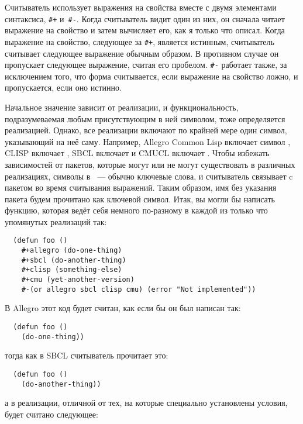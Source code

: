 Считыватель использует выражения на свойства вместе с двумя элементами синтаксиса,
\lstinline!#+! и~\lstinline!#-!. Когда считыватель видит один из них, он сначала читает
выражение на свойство и затем вычисляет его, как я только что описал. Когда выражение на
свойство, следующее за \lstinline!#+!, является истинным, считыватель считывает следующее
выражение обычным образом. В противном случае он пропускает следующее выражение, считая
его пробелом. \lstinline!#-! работает также, за исключением того, что форма считывается,
если выражение на свойство ложно, и пропускается, если оно истинно.

Начальное значение  зависит от реализации, и функциональность,
подразумеваемая любым присутствующим в ней символом, тоже определяется
реализацией. Однако, все реализации включают по крайней мере один символ, указывающий на
неё саму. Например, Allegro Common Lisp включает символ , CLISP включает
, SBCL включает  и CMUCL включает . Чтобы избежать
зависимостей от пакетов, которые могут или не могут существовать в различных реализациях,
символы в ~--- обычно ключевые слова, и считыватель связывает
 c пакетом  во время считывания выражений. Таким образом,
имя без указания пакета будем прочитано как ключевой символ. Итак, вы могли бы написать
функцию, которая ведёт себя немного по-разному в каждой из только что упомянутых
реализаций так:

\begin{lstlisting}
  (defun foo ()
    #+allegro (do-one-thing)
    #+sbcl (do-another-thing)
    #+clisp (something-else)
    #+cmu (yet-another-version)
    #-(or allegro sbcl clisp cmu) (error "Not implemented"))
\end{lstlisting}

\noindent{}В Allegro этот код будет считан, как если бы он был написан так:

\begin{lstlisting}
  (defun foo ()
    (do-one-thing))
\end{lstlisting}

\noindent{}тогда как в SBCL считыватель прочитает это:

\begin{lstlisting}
  (defun foo ()
    (do-another-thing))
\end{lstlisting}

\noindent{}а в реализации, отличной от тех, на которые специально установлены условия, будет считано
следующее:

